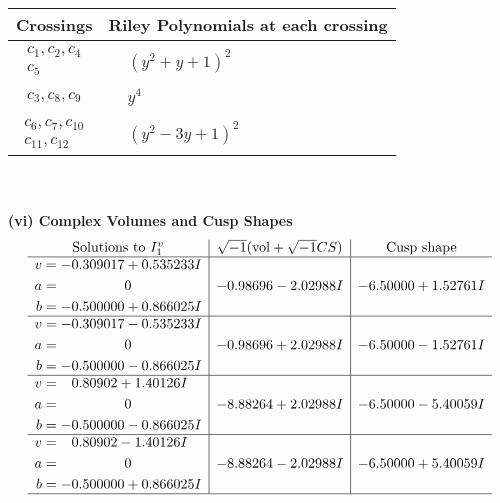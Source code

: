 \documentclass[1p]{elsarticle_modified}
\theoremstyle{definition}
\newcommand{\I}{\sqrt{-1}}
\begin{document}
\begin{tabular}{m{50pt}|m{274pt}}
Crossings & \hspace{64pt}Riley Polynomials at each crossing \\
\hline $$\begin{aligned}c_{1},c_{2},c_{4}\\c_{5}\end{aligned}$$&$\begin{aligned}
&(y^2+y+1)^2
\end{aligned}$\\
\hline $$\begin{aligned}c_{3},c_{8},c_{9}\end{aligned}$$&$\begin{aligned}
&y^4
\end{aligned}$\\
\hline $$\begin{aligned}c_{6},c_{7},c_{10}\\c_{11},c_{12}\end{aligned}$$&$\begin{aligned}
&(y^2-3 y+1)^2
\end{aligned}$\\
\hline
\end{tabular}\\~\\
\newpage\flushleft \textbf{(vi) Complex Volumes and Cusp Shapes}
$$\begin{array}{c|c|c}  
\text{Solutions to }I^v_{1}& \I (\text{vol} + \sqrt{-1}CS) & \text{Cusp shape}\\
 \hline 
\begin{aligned}
v &= -0.309017 + 0.535233 I \\
a &= \phantom{-0.000000 } 0 \\
b &= -0.500000 + 0.866025 I\end{aligned}
 & -0.98696 - 2.02988 I & -6.50000 + 1.52761 I \\ \hline\begin{aligned}
v &= -0.309017 - 0.535233 I \\
a &= \phantom{-0.000000 } 0 \\
b &= -0.500000 - 0.866025 I\end{aligned}
 & -0.98696 + 2.02988 I & -6.50000 - 1.52761 I \\ \hline\begin{aligned}
v &= \phantom{-}0.80902 + 1.40126 I \\
a &= \phantom{-0.000000 } 0 \\
b &= -0.500000 - 0.866025 I\end{aligned}
 & -8.88264 + 2.02988 I & -6.50000 - 5.40059 I \\ \hline\begin{aligned}
v &= \phantom{-}0.80902 - 1.40126 I \\
a &= \phantom{-0.000000 } 0 \\
b &= -0.500000 + 0.866025 I\end{aligned}
 & -8.88264 - 2.02988 I & -6.50000 + 5.40059 I\\
 \hline 
 \end{array}$$\newpage
\end{document}
